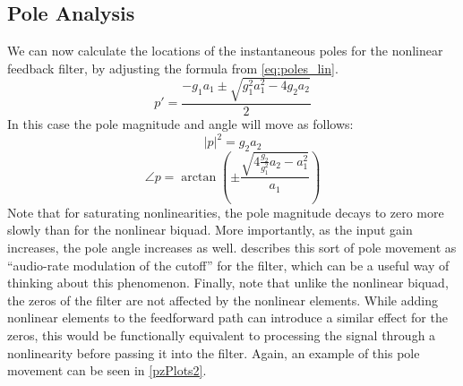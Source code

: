 \documentclass{IEEEtran}
\begin{document}
\subsection{Pole Analysis}
%
We can now calculate the locations of the instantaneous poles for
the nonlinear feedback filter, by adjusting the formula from
\cref{eq:poles_lin}.
%
\begin{equation}
p' = \frac{-g_1 a_1 \pm \sqrt{g_1^2 a_1^2 - 4 g_2 a_2}}{2}
    \label{eq:poles_nl2}
\end{equation}
%
In this case the pole magnitude and angle will move as follows:
\begin{equation}
    |p|^2 = g_2a_2
    \label{eq:poles_nl2_mag}
\end{equation}
%
\begin{equation}
    \angle p = \arctan \left( \pm \frac{\sqrt{4\frac{g_2}{g_1^2}a_2 - a_1^2}}{a_1} \right)
    \label{eq:poles_nl2_angle}
\end{equation}
%
Note that for saturating nonlinearities, the pole magnitude decays to
zero more slowly than for the
nonlinear biquad. More importantly, as the input gain increases,
the pole angle increases as well. \cite{Vadim} describes this sort of
pole movement as ``audio-rate modulation of the cutoff'' for the
filter, which can be a useful way of thinking about this phenomenon.
\newline\newline
Finally, note that unlike the nonlinear biquad, the zeros of the
filter are not affected by the nonlinear elements.
While adding nonlinear elements to the feedforward path can introduce 
a similar effect for the zeros, this would be
functionally equivalent to processing the signal through a nonlinearity
before passing it into the filter. Again, an example of this pole movement
can be seen in \cref{pzPlots2}.
%
\end{document}
